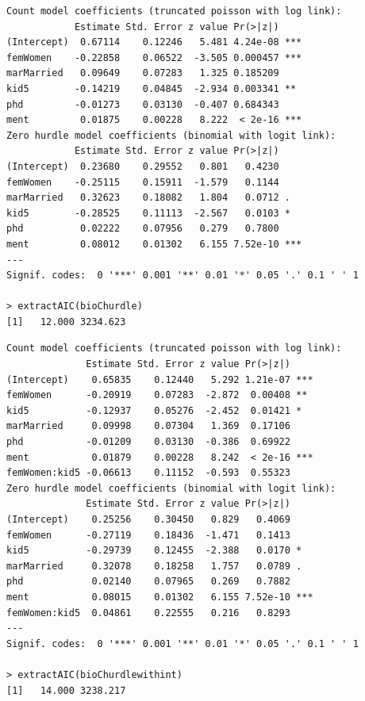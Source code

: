 \documentclass{BeamerTemplate}
\begin{document}
\begin{refsection}
\begin{frame}[fragile]{}
{\scriptsize
\begin{verbatim}
Count model coefficients (truncated poisson with log link):
            Estimate Std. Error z value Pr(>|z|)    
(Intercept)  0.67114    0.12246   5.481 4.24e-08 ***
femWomen    -0.22858    0.06522  -3.505 0.000457 ***
marMarried   0.09649    0.07283   1.325 0.185209    
kid5        -0.14219    0.04845  -2.934 0.003341 ** 
phd         -0.01273    0.03130  -0.407 0.684343    
ment         0.01875    0.00228   8.222  < 2e-16 ***
Zero hurdle model coefficients (binomial with logit link):
            Estimate Std. Error z value Pr(>|z|)    
(Intercept)  0.23680    0.29552   0.801   0.4230    
femWomen    -0.25115    0.15911  -1.579   0.1144    
marMarried   0.32623    0.18082   1.804   0.0712 .  
kid5        -0.28525    0.11113  -2.567   0.0103 *  
phd          0.02222    0.07956   0.279   0.7800    
ment         0.08012    0.01302   6.155 7.52e-10 ***
---
Signif. codes:  0 '***' 0.001 '**' 0.01 '*' 0.05 '.' 0.1 ' ' 1 

> extractAIC(bioChurdle)
[1]   12.000 3234.623
\end{verbatim}
}

\end{frame}

\begin{frame}[fragile]{}
{\scriptsize
\begin{verbatim}
Count model coefficients (truncated poisson with log link):
              Estimate Std. Error z value Pr(>|z|)    
(Intercept)    0.65835    0.12440   5.292 1.21e-07 ***
femWomen      -0.20919    0.07283  -2.872  0.00408 ** 
kid5          -0.12937    0.05276  -2.452  0.01421 *  
marMarried     0.09998    0.07304   1.369  0.17106    
phd           -0.01209    0.03130  -0.386  0.69922    
ment           0.01879    0.00228   8.242  < 2e-16 ***
femWomen:kid5 -0.06613    0.11152  -0.593  0.55323    
Zero hurdle model coefficients (binomial with logit link):
              Estimate Std. Error z value Pr(>|z|)    
(Intercept)    0.25256    0.30450   0.829   0.4069    
femWomen      -0.27119    0.18436  -1.471   0.1413    
kid5          -0.29739    0.12455  -2.388   0.0170 *  
marMarried     0.32078    0.18258   1.757   0.0789 .  
phd            0.02140    0.07965   0.269   0.7882    
ment           0.08015    0.01302   6.155 7.52e-10 ***
femWomen:kid5  0.04861    0.22555   0.216   0.8293    
---
Signif. codes:  0 '***' 0.001 '**' 0.01 '*' 0.05 '.' 0.1 ' ' 1 

> extractAIC(bioChurdlewithint)
[1]   14.000 3238.217
\end{verbatim}
}
\end{frame}


\end{refsection}
\end{document}
